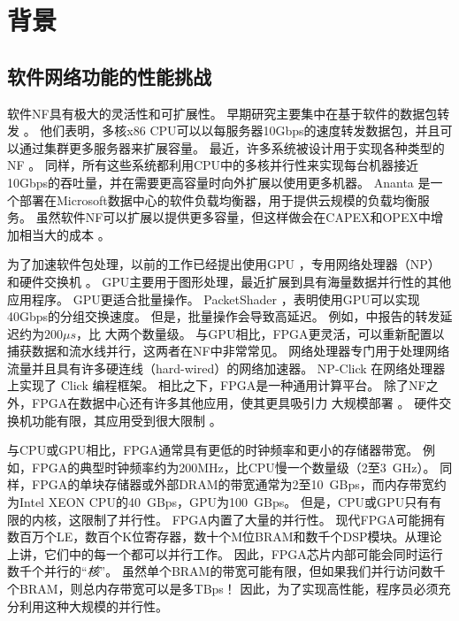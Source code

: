 \section{背景}
\label{clicknp:sec:background}

\subsection{软件网络功能的性能挑战}

软件NF具有极大的灵活性和可扩展性。
早期研究主要集中在基于软件的数据包转发 \cite {routebricks,Egi:2008:THP:1544012.1544032}。
他们表明，多核x86 CPU可以以每服务器10Gbps的速度转发数据包，并且可以通过集群更多服务器来扩展容量。
最近，许多系统被设计用于实现各种类型的NF \cite {comb,Greenhalgh:2009:FPR:1517480.1517484,martins2014clickos}。
同样，所有这些系统都利用CPU中的多核并行性来实现每台机器接近10Gbps的吞吐量，并在需要更高容量时向外扩展以使用更多机器。
Ananta \cite {ananta}是一个部署在Microsoft数据中心的软件负载均衡器，用于提供云规模的负载均衡服务。
虽然软件NF可以扩展以提供更多容量，但这样做会在CAPEX和OPEX中增加相当大的成本 \cite {ananta,duet}。

为了加速软件包处理，以前的工作已经提出使用GPU \cite {packetshader}，专用网络处理器（NP）\cite {cavium,netronome} 和硬件交换机 \cite {duet}。
GPU主要用于图形处理，最近扩展到具有海量数据并行性的其他应用程序。 GPU更适合批量操作。 PacketShader \cite {packetshader}，表明使用GPU可以实现40Gbps的分组交换速度。
但是，批量操作会导致高延迟。
例如，\cite {packetshader}中报告的转发延迟约为$200 \mu{}s$，比 \name{} 大两个数量级。
与GPU相比，FPGA更灵活，可以重新配置以捕获数据和流水线并行，这两者在NF中非常常见。
网络处理器专门用于处理网络流量并且具有许多硬连线（hard-wired）的网络加速器。
NP-Click \cite{shah2004np} 在网络处理器上实现了 Click 编程框架。
相比之下，FPGA是一种通用计算平台。
除了NF之外，FPGA在数据中心还有许多其他应用，使其更具吸引力
大规模部署 \cite {putnam2014reconfigurable}。
硬件交换机功能有限，其应用受到很大限制 \cite {duet}。

与CPU或GPU相比，FPGA通常具有更低的时钟频率和更小的存储器带宽。
例如，FPGA的典型时钟频率约为200MHz，比CPU慢一个数量级（2至3~GHz）。
同样，FPGA的单块存储器或外部DRAM的带宽通常为2至10~GBps，而内存带宽约为Intel XEON CPU的40~GBps，GPU为100~GBps。
但是，CPU或GPU只有有限的内核，这限制了并行性。 FPGA内置了大量的并行性。
现代FPGA可能拥有数百万个LE，数百个K位寄存器，数十个M位BRAM和数千个DSP模块。从理论上讲，它们中的每一个都可以并行工作。
因此，FPGA芯片内部可能会同时运行数千个并行的``\textit {核}''。
虽然单个BRAM的带宽可能有限，但如果我们并行访问数千个BRAM，则总内存带宽可以是多TBps！
因此，为了实现高性能，程序员必须充分利用这种大规模的并行性。

